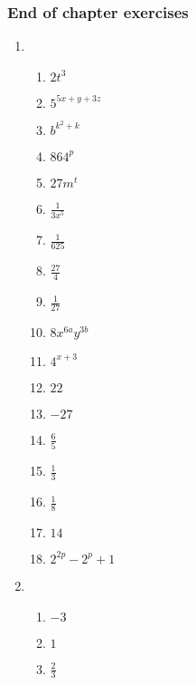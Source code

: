 {\begin{multicols}{3}
  \subsubsection*{End of chapter exercises} %
  \begin{enumerate}[label=\textbf{\arabic*}., noitemsep]
  \item %
    \begin{enumerate}[label=\textbf{(\alph*)}, itemsep=1pt]
    \item $2t^3$%
    \item $5^{5x+y+3z}$%
    \item $b^{k^{2}+k}$%
    \item $864^p$%
    \item $27m^t$%
    \item $\frac{1}{3x^5}$%
    \item $\frac{1}{625}$%
    \item $\frac{27}{4}$%
    \item $\frac{1}{27}$%
    \item $8x^{6a}y^{3b}$%
    \item $4^{x+3}$%
    \item $22$%
    \item $-27$%
    \item $\frac{6}{5}$%
    \item $\frac{1}{3}$%
    \item $\frac{1}{8}$%
    \item $14$%
    \item $2^{2p}-2^p+1$%
    \end{enumerate}
  \item %
    \begin{enumerate}[label=\textbf{(\alph*)}, itemsep=1pt]
    \item $-3$%
    \item $1$%
    \item $\frac{2}{3}$%

\end{enumerate}
\end{enumerate}
\end{multicols}}
